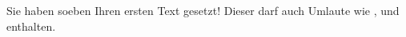 \documentclass{article}
\begin{document}
Sie haben soeben Ihren ersten Text gesetzt! Dieser darf auch Umlaute wie ,  und  enthalten.
\end{document}
